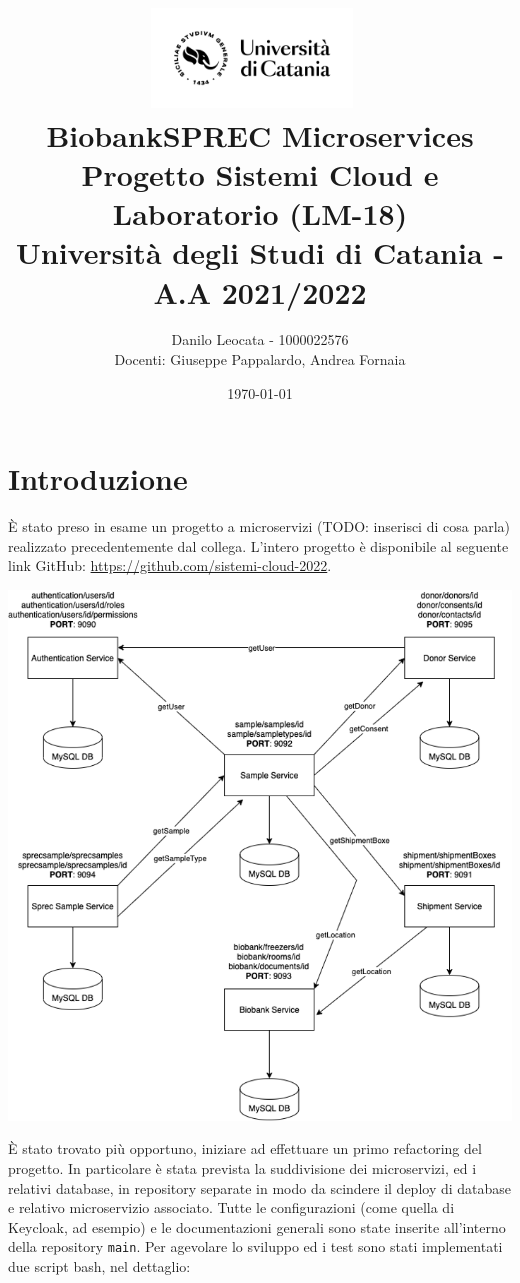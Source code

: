 \documentclass{article}
\title{ %
\includegraphics[width=0.4\textwidth]{UniCT-Logo-Nero}~\\
BiobankSPREC Microservices \\ 
\large Progetto Sistemi Cloud e Laboratorio (LM-18) \\ Università degli Studi di Catania - A.A 2021/2022 \\
}
\author{ Danilo Leocata - 1000022576 \\ Docenti: Giuseppe Pappalardo, Andrea Fornaia}
\date{\today}
\begin{document}
\maketitle %

\pagebreak




\section{Introduzione}

È stato preso in esame un progetto a microservizi (TODO: inserisci di cosa parla) realizzato precedentemente dal collega.
L'intero progetto è disponibile al seguente link GitHub: \href{https://github.com/sistemi-cloud-2022}{https://github.com/sistemi-cloud-2022}.

\begin{center}
    \includegraphics[width=0.6\linewidth]{architettura.png}
\end{center}


È stato trovato più opportuno, iniziare ad effettuare un primo refactoring del progetto.
In particolare è stata prevista la suddivisione dei microservizi, ed i relativi database, in repository separate in modo da scindere il deploy di database e relativo microservizio associato.
Tutte le configurazioni (come quella di Keycloak, ad esempio) e le documentazioni generali sono state inserite all’interno della repository \texttt{main}. Per agevolare lo sviluppo ed i test sono stati implementati due script bash, nel dettaglio:
\end{document}
